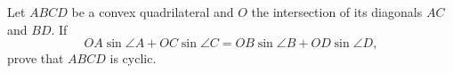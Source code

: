 Let $ABCD$ be a convex quadrilateral and $O$ the intersection of its diagonals $AC$ and $BD$. If
\[ OA \sin \angle A + OC \sin \angle C = OB \sin \angle B + OD \sin \angle D, \]
prove that $ABCD$ is cyclic.
